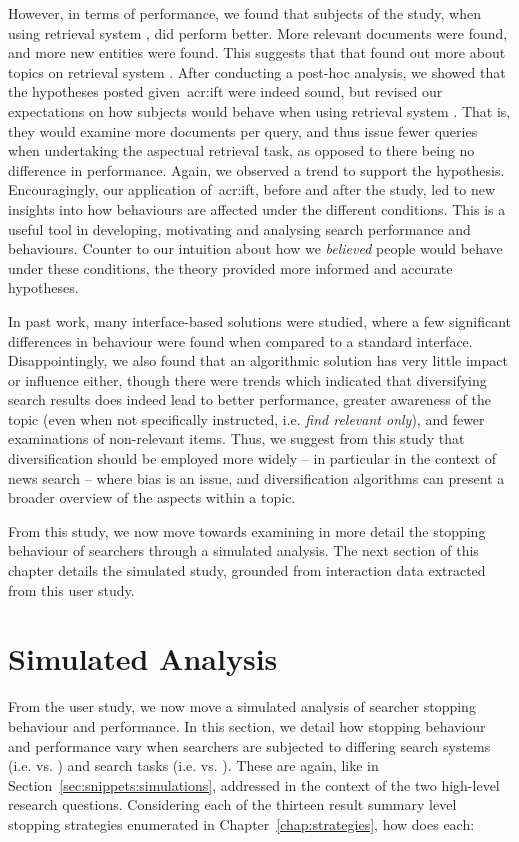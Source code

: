 However, in terms of performance, we found that subjects of the study, when using retrieval system , did perform better. More relevant documents were found, and more new entities were found. This suggests that that found out more about topics on retrieval system . After conducting a post-hoc analysis, we showed that the hypotheses posted given~\gls{acr:ift} were indeed sound, but revised our expectations on how subjects would behave when using retrieval system . That is, they would examine more documents per query, and thus issue fewer queries when undertaking the aspectual retrieval task, as opposed to there being no difference in performance. Again, we observed a trend to support the hypothesis. Encouragingly, our application of~\gls{acr:ift}, before and after the study, led to new insights into how behaviours are affected under the different conditions. This is a useful tool in developing, motivating and analysing search performance and behaviours. Counter to our intuition about how we \emph{believed} people would behave under these conditions, the theory provided more informed and accurate hypotheses.

In past work, many interface-based solutions were studied, where a few significant differences in behaviour were found when compared to a standard interface. Disappointingly, we also found that an algorithmic solution has very little impact or influence either, though there were trends which indicated that diversifying search results does indeed lead to better performance, greater awareness of the topic (even when not specifically instructed, i.e. \emph{find relevant only}), and fewer examinations of non-relevant items. Thus, we suggest from this study that diversification should be employed more widely -- in particular in the context of news search -- where bias is an issue, and diversification algorithms can present a broader overview of the aspects within a topic.

From this study, we now move towards examining in more detail the stopping behaviour of searchers through a simulated analysis. The next section of this chapter details the simulated study, grounded from interaction data extracted from this user study.

\section{Simulated Analysis}\label{sec:diversity:simulated}
From the user study, we now move a simulated analysis of searcher stopping behaviour and performance. In this section, we detail how stopping behaviour and performance vary when searchers are subjected to differing search systems (i.e.  vs. ) and search tasks (i.e.  vs. ). These are again, like in Section~\ref{sec:snippets:simulations}, addressed in the context of the two high-level research questions. Considering each of the thirteen result summary level stopping strategies enumerated in Chapter~\ref{chap:strategies}, how does each:

